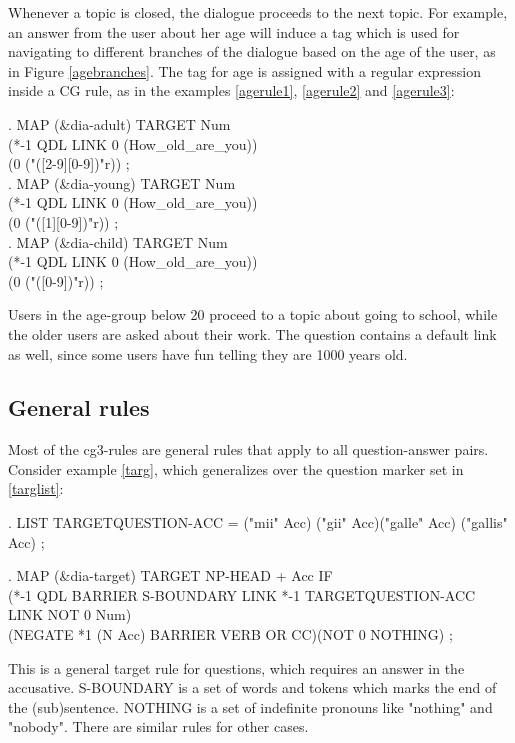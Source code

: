 \documentclass[11pt]{article}
\begin{document}
Whenever a topic is closed, the dialogue proceeds to the next topic. For example, an answer from the user about her age will induce a tag which is used for navigating to different branches of the dialogue based on the age of the user, as in Figure \ref{agebranches}. The tag for age is assigned with a regular expression inside a CG rule, as in the examples \ref{agerule1}, \ref{agerule2} and \ref{agerule3}: 

\ex.\flushleft\label{agerule1}  \small{MAP (\&dia-adult) TARGET Num \\(*-1 QDL LINK 0 (How\_old\_are\_you)) \\ (0 ("([2-9][0-9])"r)) ;} \\

\ex.\flushleft\label{agerule2} \small{MAP (\&dia-young) TARGET Num \\(*-1 QDL LINK 0 (How\_old\_are\_you))\\ (0 ("([1][0-9])"r)) ;} \\

\ex.\flushleft\label{agerule3} \small{MAP (\&dia-child) TARGET Num \\(*-1 QDL LINK 0 (How\_old\_are\_you)) \\(0 ("([0-9])"r)) ;} 

Users in the age-group below 20 proceed to a topic about going to school, while the older users are asked about their work. The question contains a  default link as well, since some users have fun telling they are 1000 years old.

\subsection{General rules} \label{general} 
Most of the cg3-rules are general rules that apply to all question-answer pairs. Consider example \ref{targ},  which generalizes over the question marker set in \ref{targlist}:

\ex.\flushleft\label{targlist} \small{LIST TARGETQUESTION-ACC = ("mii" Acc) ("gii" Acc)("galle" Acc) ("gallis" Acc) ;}

\ex.\flushleft\label{targ} \small{MAP (\&dia-target) TARGET NP-HEAD + Acc IF \\
(*-1 QDL BARRIER S-BOUNDARY LINK *-1 TARGETQUESTION-ACC LINK NOT 0 Num)\\
(NEGATE *1 (N Acc) BARRIER VERB OR CC)(NOT 0 NOTHING) ;}

This is a general target rule for questions, which requires an answer in the accusative. S-BOUNDARY is a set of words and tokens which marks the end of the (sub)sentence. NOTHING is a set of indefinite pronouns like "nothing" and "nobody". There are similar rules for other cases. 
\end{document}
